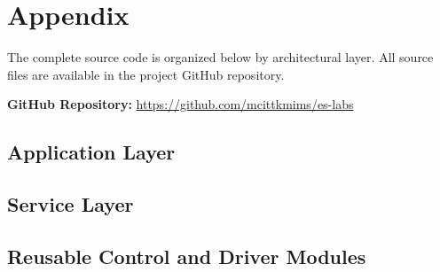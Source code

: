 \section{Appendix}

The complete source code is organized below by architectural layer. All source files are available in the project GitHub repository.

\textbf{GitHub Repository:} \url{https://github.com/mcittkmims/es-labs}

\subsection{Application Layer}






\subsection{Service Layer}









\subsection{Reusable Control and Driver Modules}

